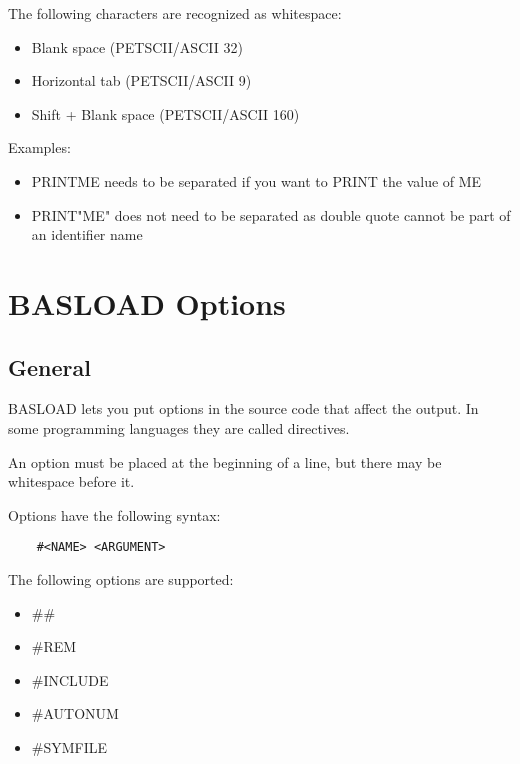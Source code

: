\documentclass{article}
\begin{document}
        The following characters are recognized as whitespace:

        \begin{itemize}
            \item Blank space (PETSCII/ASCII 32)
            \item Horizontal tab (PETSCII/ASCII 9)
            \item Shift + Blank space (PETSCII/ASCII 160)
        \end{itemize}

        Examples:

        \begin{itemize}
            \item PRINTME needs to be separated if you want to PRINT the value of ME
            \item PRINT"ME" does not need to be separated as double quote cannot be part of an identifier name
        \end{itemize}

\section{BASLOAD Options}

    \subsection{General}

        BASLOAD lets you put options in the source code that affect the output. In some
        programming languages they are called directives.

        An option must be placed at the beginning of a line, but there may be
        whitespace before it.

        Options have the following syntax:

        \begin{verbatim}
    #<NAME> <ARGUMENT>
        \end{verbatim}

        The following options are supported:

        \begin{itemize}
            \item \#\#
            \item \#REM
            \item \#INCLUDE
            \item \#AUTONUM
            \item \#SYMFILE
        \end{itemize}
\end{document}

